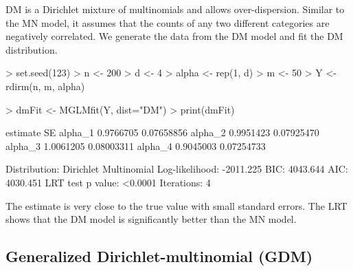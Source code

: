 \documentclass[a4paper]{article}
\begin{document}
DM is a Dirichlet mixture of multinomials and allows over-dispersion. Similar to the MN model, it assumes that the counts of any two different categories are negatively correlated. We generate the data from the DM model and fit the DM distribution.
\begin{Schunk}
\begin{Sinput}
> set.seed(123)
> n <- 200
> d <- 4
> alpha <- rep(1, d)
> m <- 50
> Y <- rdirm(n, m, alpha)
\end{Sinput}
\end{Schunk}
\begin{Schunk}
\begin{Sinput}
> dmFit <- MGLMfit(Y, dist="DM")
> print(dmFit)
\end{Sinput}
\begin{Soutput}
         estimate         SE
alpha_1 0.9766705 0.07658856
alpha_2 0.9951423 0.07925470
alpha_3 1.0061205 0.08003311
alpha_4 0.9045003 0.07254733

Distribution: Dirichlet Multinomial
Log-likelihood: -2011.225
BIC: 4043.644
AIC: 4030.451
LRT test p value: <0.0001
Iterations: 4
\end{Soutput}
\end{Schunk}
The estimate is very close to the true value with small standard errors. The LRT shows that the DM model is significantly better than the MN model.

\subsection{Generalized Dirichlet-multinomial (GDM)}
\end{document}
